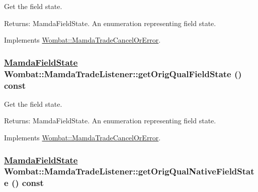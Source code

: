 Get the field state. 

\begin{Desc}
\item[Returns:]Mamda\-Field\-State. An enumeration representing field state. \end{Desc}


Implements \hyperlink{classWombat_1_1MamdaTradeCancelOrError_0aa9f79553091ce4de69eb380be0f7b5}{Wombat::Mamda\-Trade\-Cancel\-Or\-Error}.\hypertarget{classWombat_1_1MamdaTradeListener_04acb5179a6d640a0a54fd30df321b85}{
\subsubsection[getOrigQualFieldState]{\setlength{\rightskip}{0pt plus 5cm}\hyperlink{namespaceWombat_93aac974f2ab713554fd12a1fa3b7d2a}{Mamda\-Field\-State} Wombat::Mamda\-Trade\-Listener::get\-Orig\-Qual\-Field\-State () const}}
\label{classWombat_1_1MamdaTradeListener_04acb5179a6d640a0a54fd30df321b85}


Get the field state. 

\begin{Desc}
\item[Returns:]Mamda\-Field\-State. An enumeration representing field state. \end{Desc}


Implements \hyperlink{classWombat_1_1MamdaTradeCancelOrError_8204745a6698558a00ec0140622de754}{Wombat::Mamda\-Trade\-Cancel\-Or\-Error}.\hypertarget{classWombat_1_1MamdaTradeListener_3901e347c7b178d7c30d016180133738}{
\subsubsection[getOrigQualNativeFieldState]{\setlength{\rightskip}{0pt plus 5cm}\hyperlink{namespaceWombat_93aac974f2ab713554fd12a1fa3b7d2a}{Mamda\-Field\-State} Wombat::Mamda\-Trade\-Listener::get\-Orig\-Qual\-Native\-Field\-State () const}}
\label{classWombat_1_1MamdaTradeListener_3901e347c7b178d7c30d016180133738}


